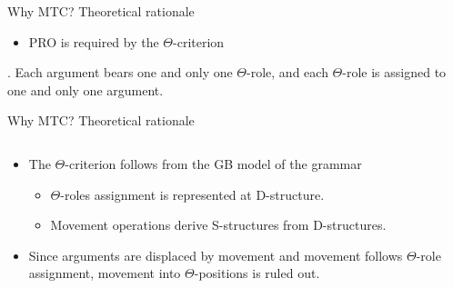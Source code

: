 \documentclass{beamer}
\begin{document}
\begin{frame}
  {Why MTC?}
  {Theoretical rationale \parencite[see also][]{hornstein2001move}}

  \begin{itemize}
    \item PRO is required by the $\Theta$-criterion
  \end{itemize}
  \ex. Each argument bears one and only one $\Theta$-role, and each $\Theta$-role is assigned to one and only one argument. \parencite[36]{chomsky1981lectures}

\end{frame}
\begin{frame}
  {Why MTC?}
  {Theoretical rationale \parencite[see also][]{hornstein2001move}}
 
  \begin{columns}
    \begin{column}[T]{0.5\textwidth}
      \begin{itemize}
	\item The $\Theta$-criterion follows from the GB model of the grammar
	  \begin{itemize}
	    \item $\Theta$-roles assignment is represented at D-structure.
	    \item Movement operations derive S-structures from D-structures.
	  \end{itemize}
	\item Since arguments are displaced by movement and movement follows $\Theta$-role assignment, movement into $\Theta$-positions is ruled out.
      \end{itemize}
    \end{column}
    \begin{column}[T]{0.5\textwidth}
      {\small
  }
    \end{column}
  \end{columns}
\end{frame}
\end{document}
